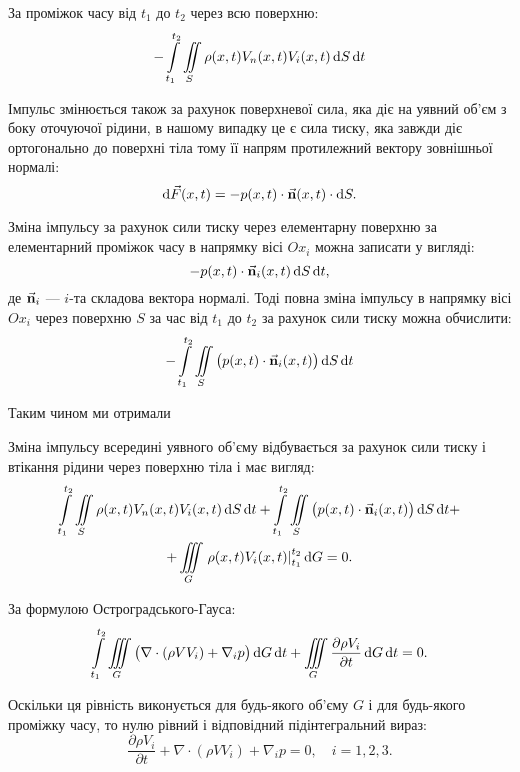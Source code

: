За проміжок часу від $t_1$ до $t_2$ через всю поверхню:
\begin{equation}
	- \Int_{t_1}^{t_2} \Iint_S \rho(x, t) V_n(x, t) V_i(x, t) \diff S \diff t
\end{equation}

Імпульс змінюється також за рахунок поверхневої сила, яка діє на уявний об'єм з боку оточуючої рідини, в нашому випадку це є сила тиску, яка завжди діє ортогонально до поверхні тіла тому її напрям протилежний вектору зовнішньої нормалі: 
\begin{equation}
	\diff \vec F(x, t) = - p(x, t) \cdot \vec{\bf{n}} (x, t) \cdot \diff S.
\end{equation}

Зміна імпульсу за рахунок сили тиску через елементарну поверхню за елементарний проміжок часу в напрямку вісі $Ox_i$ можна записати у вигляді: 
\begin{equation}
	-p(x, t) \cdot \vec{\bf{n}}_i (x, t) \diff S \diff t,
\end{equation}
де $\vec{\bf{n}}_i$ --- $i$-та складова вектора нормалі. Тоді повна зміна імпульсу в напрямку вісі $Ox_i$ через поверхню $S$ за час від $t_1$ до $t_2$ за рахунок сили тиску можна обчислити:
\begin{equation}
	- \Int_{t_1}^{t_2} \Iint_S \big( p(x, t) \cdot \vec{\bf{n}}_i(x, t) \big) \diff S \diff t
\end{equation}

Таким чином ми отримали
\begin{law}
	\label{law:impulse-conservation}
	Зміна імпульсу всередині уявного об'єму відбувається за рахунок сили тиску і втікання рідини через поверхню тіла і має вигляд:
	\begin{multline}
	\Int_{t_1}^{t_2} \Iint_S \rho(x, t) V_n(x, t) V_i(x, t) \diff S \diff t+\Int_{t_1}^{t_2} \Iint_S \big( p(x, t) \cdot \vec{\bf{n}}_i(x, t) \big) \diff S \diff t +\\
	+	 \Iiint_G \left. \rho(x, t) V_i(x, t) \right|_{t_1}^{t_2} \diff G = 0.
	\end{multline}
\end{law}

За формулою Остроградського-Гауса:
\begin{equation}
	\Int_{t_1}^{t_2} \Iiint_G \big( \nabla \cdot (\rho V V_i) + \nabla_i p \big) \diff G \diff t + \Iiint_G \frac{\partial \rho V_i}{\partial t}\diff G \diff t = 0.
\end{equation}

Оскільки ця рівність виконується для будь-якого об'єму $G$ і для будь-якого проміжку часу, то нулю рівний і відповідний підінтегральний вираз:
\begin{equation}
\frac{\partial \rho V_i}{\partial t} +	\nabla \cdot (\rho V V_i) + \nabla_i p = 0, \quad i = 1, 2, 3.
\end{equation}

